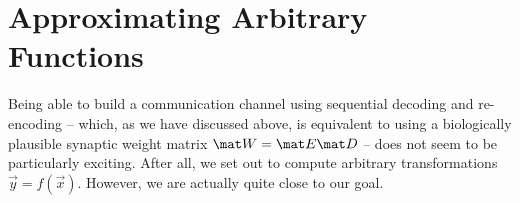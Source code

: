 \documentclass[10pt,letterpaper,oneside]{article}
\begin{document}
{%
	
	}


	
	\section{Approximating Arbitrary Functions}

	Being able to build a communication channel using sequential decoding and re-encoding -- which, as we have discussed above, is equivalent to using a biologically plausible synaptic weight matrix $\mat W = \mat E \mat D$ -- does not seem to be particularly exciting. After all, we set out to compute arbitrary transformations $\vec y = f(\vec x)$. However, we are actually quite close to our goal.
\end{document}

